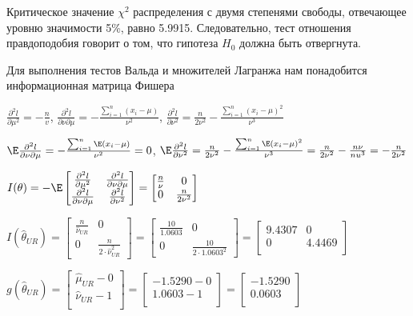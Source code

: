 \documentclass[pdftex,11pt,openany]{book}\usepackage[]{graphicx}\usepackage[]{color}
\begin{document}
\begin{solution}
Критическое значение $\chi^2$ распределения с двумя степенями свободы, отвечающее уровню значимости 5\%, равно 5.9915. Следовательно, тест отношения правдоподобия говорит о том, что гипотеза $H_0$ должна быть отвергнута.

Для выполнения тестов Вальда и множителей Лагранжа нам понадобится информационная матрица Фишера

$\frac{\partial^2 l}{\partial \mu^2} = -\frac{n}{v}$, $\frac{\partial^2 l}{\partial \nu \partial \mu} = -\frac{\sum_{i=1}^n (x_i - \mu)}{\nu^2}$, $\frac{\partial^2 l}{\partial \nu^2} = \frac{n}{2\nu^2} - \frac{\sum_{i=1}^n (x_i - \mu)^2}{\nu^3}$

$\E \frac{\partial^2 l}{\partial \nu \partial \mu} = -\frac{\sum_{i=1}^n \E(x_i - \mu)}{\nu^2} = 0$, $\E \frac{\partial^2 l}{\partial \nu^2} = \frac{n}{2\nu^2} - \frac{\sum_{i=1}^n \E(x_i - \mu)^2}{\nu^3} = \frac{n}{2\nu^2} - \frac{n\nu}{nu^3} =- \frac{n}{2\nu^2}$

$I(\theta) = -\E \begin{bmatrix}
\frac{\partial^2 l}{\partial \mu^2} & \frac{\partial^2 l}{\partial \nu \partial \mu} \\
\frac{\partial^2 l}{\partial \nu \partial \mu} & \frac{\partial^2 l}{\partial \nu^2} \\
\end{bmatrix} = \begin{bmatrix}
\frac{n}{\nu} & 0 \\
0 & \frac{n}{2\nu^2}
\end{bmatrix}$

$I(\hat{\theta}_{UR}) = \begin{bmatrix}
\frac{n}{\hat{\nu}_{UR}} & 0 \\
0 & \frac{n}{2 \cdot \hat{\nu}_{UR}^2}
\end{bmatrix} = \begin{bmatrix}
\frac{10}{1.0603} & 0 \\
0 & \frac{10}{2 \cdot 1.0603^2}
\end{bmatrix} = \begin{bmatrix}
9.4307 & 0 \\
0 & 4.4469 \\
\end{bmatrix}$

$g(\hat{\theta}_{UR}) = \begin{bmatrix}
\hat{\mu}_{UR} - 0 \\
\hat{\nu}_{UR} - 1 \\
\end{bmatrix} = \begin{bmatrix}
-1.5290 - 0\\
1.0603 - 1 \\
\end{bmatrix} = \begin{bmatrix}
-1.5290\\
0.0603 \\
\end{bmatrix}$


\end{solution}
\end{document}
